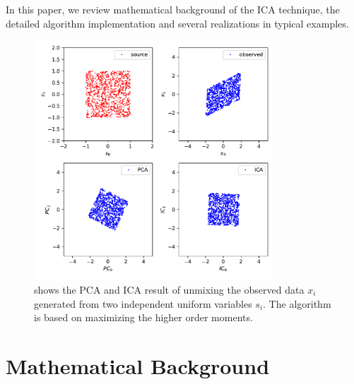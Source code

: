 \documentclass[aps,prl,preprint,superscriptaddress]{revtex4-2}
\begin{document}
In this paper, we review mathematical background of the ICA technique, the detailed algorithm implementation and several realizations in typical examples.

\begin{figure}[b]
\includegraphics[width=0.8\textwidth]{scripts/ICA_vs_PCA.pdf}
\caption{\label{fig:ICA_vs_PCA} shows the PCA and ICA result of unmixing the observed data $x_{i}$ generated from two independent uniform variables $s_{i}$. The algorithm is based on maximizing the higher order moments. }
\end{figure}


\section{Mathematical Background}
\end{document}
